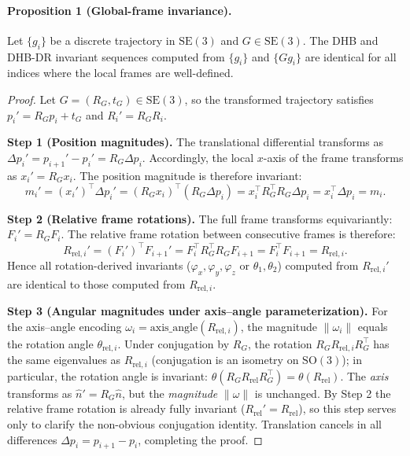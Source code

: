\documentclass[11pt]{article}
\begin{document}
\paragraph{Proposition 1 (Global-frame invariance).}
Let $\{g_i\}$ be a discrete trajectory in $\mathrm{SE}(3)$ and $G \in \mathrm{SE}(3)$. The DHB and DHB-DR invariant sequences computed from $\{g_i\}$ and $\{G g_i\}$ are identical for all indices where the local frames are well-defined.

\begin{proof}
Let $G = (R_G, t_G) \in \mathrm{SE}(3)$, so the transformed trajectory satisfies $p_i' = R_G p_i + t_G$ and $R_i' = R_G R_i$.

\textbf{Step 1 (Position magnitudes).}
The translational differential transforms as $\Delta p_i' = p_{i+1}' - p_i' = R_G \Delta p_i$.
Accordingly, the local $x$-axis of the frame transforms as $x_i' = R_G x_i$.
The position magnitude is therefore invariant:
\begin{equation}
  m_i' = (x_i')^\top \Delta p_i' = (R_G x_i)^\top (R_G \Delta p_i)
        = x_i^\top R_G^\top R_G \Delta p_i = x_i^\top \Delta p_i = m_i.
\end{equation}

\textbf{Step 2 (Relative frame rotations).}
The full frame transforms equivariantly: $F_i' = R_G F_i$.
The relative frame rotation between consecutive frames is therefore:
\begin{equation}
  R_{\mathrm{rel},i}' = (F_i')^\top F_{i+1}' = F_i^\top R_G^\top R_G F_{i+1}
                      = F_i^\top F_{i+1} = R_{\mathrm{rel},i}.
\end{equation}
Hence all rotation-derived invariants ($\varphi_x, \varphi_y, \varphi_z$ or $\theta_1, \theta_2$) computed
from $R_{\mathrm{rel},i}'$ are identical to those computed from $R_{\mathrm{rel},i}$.

\textbf{Step 3 (Angular magnitudes under axis--angle parameterization).}
For the axis--angle encoding $\omega_i = \mathrm{axis\_angle}(R_{\mathrm{rel},i})$, the magnitude
$\|\omega_i\|$ equals the rotation angle $\theta_{\mathrm{rel},i}$.
Under conjugation by $R_G$, the rotation $R_G R_{\mathrm{rel},i} R_G^\top$ has the same eigenvalues as
$R_{\mathrm{rel},i}$ (conjugation is an isometry on $\mathrm{SO}(3)$); in particular, the rotation angle
is invariant: $\theta(R_G R_{\mathrm{rel}} R_G^\top) = \theta(R_{\mathrm{rel}})$.
The \emph{axis} transforms as $\hat{n}' = R_G \hat{n}$, but the \emph{magnitude} $\|\omega\|$ is
unchanged.  By Step 2 the relative frame rotation is already fully invariant ($R_{\mathrm{rel}}' =
R_{\mathrm{rel}}$), so this step serves only to clarify the non-obvious conjugation identity.
Translation cancels in all differences $\Delta p_i = p_{i+1} - p_i$, completing the proof.
\end{proof}
\end{document}
